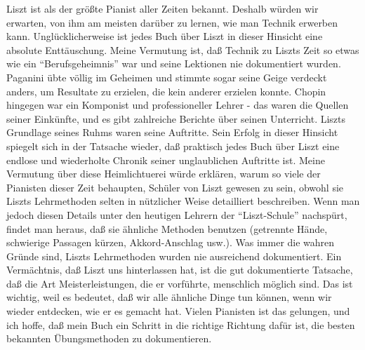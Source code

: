 Liszt ist als der größte Pianist aller Zeiten bekannt.
Deshalb würden wir erwarten, von ihm am meisten darüber zu lernen, wie man Technik erwerben kann.
Unglücklicherweise ist jedes Buch über Liszt in dieser Hinsicht eine absolute Enttäuschung.
Meine Vermutung ist, daß Technik zu Liszts Zeit so etwas wie ein \enquote{Berufsgeheimnis} war und seine Lektionen nie dokumentiert wurden.
Paganini übte völlig im Geheimen und stimmte sogar seine Geige verdeckt anders, um Resultate zu erzielen, die kein anderer erzielen konnte.
Chopin hingegen war ein Komponist und professioneller Lehrer - das waren die Quellen seiner Einkünfte, und es gibt zahlreiche Berichte über seinen Unterricht.
Liszts Grundlage seines Ruhms waren seine Auftritte.
Sein Erfolg in dieser Hinsicht spiegelt sich in der Tatsache wieder, daß praktisch jedes Buch über Liszt eine endlose und wiederholte Chronik seiner unglaublichen Auftritte ist.
Meine Vermutung über diese Heimlichtuerei würde erklären, warum so viele der Pianisten dieser Zeit behaupten, Schüler von Liszt gewesen zu sein, obwohl sie Liszts Lehrmethoden selten in nützlicher Weise detailliert beschreiben.
Wenn man jedoch diesen Details unter den heutigen Lehrern der \enquote{Liszt-Schule} nachspürt, findet man heraus, daß sie ähnliche Methoden benutzen (getrennte Hände, schwierige Passagen kürzen, Akkord-Anschlag usw.).
Was immer die wahren Gründe sind, Liszts Lehrmethoden wurden nie ausreichend dokumentiert.
Ein Vermächtnis, daß Liszt uns hinterlassen hat, ist die gut dokumentierte Tatsache, daß die Art Meisterleistungen, die er vorführte, menschlich möglich sind.
Das ist wichtig, weil es bedeutet, daß wir alle ähnliche Dinge tun können, wenn wir wieder entdecken, wie er es gemacht hat.
Vielen Pianisten ist das gelungen, und ich hoffe, daß mein Buch ein Schritt in die richtige Richtung dafür ist, die besten bekannten Übungsmethoden zu dokumentieren.

